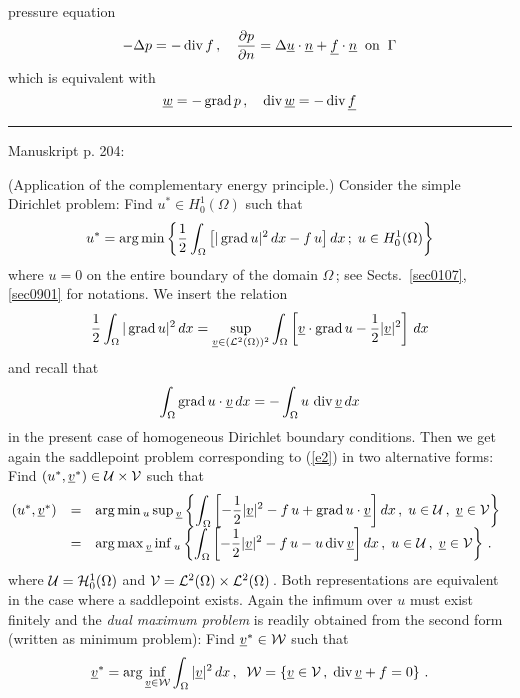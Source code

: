 \documentclass[12pt,a4paper,USenglish,twoside]{book}
\begin{document}
pressure equation 
\[
-\Delta p = - \mathop{\rm div}\nolimits f\,,\quad 
\frac{\partial p}{\partial n} = \Delta \underline{u} \cdot \underline{n} + \underline{f}\cdot \underline{n} \;\; \text{on} \;\; \Gamma
\]
which is equivalent with
\[
\underline{w} = -\mathop{\rm grad}\nolimits p \,,\quad \mathop{\rm div}\nolimits\underline{w} = - \mathop{\rm div}\nolimits \underline{f}
\]
\par\vspace{1ex}\hrule\vspace{1ex}
\newpage
Manuskript p. 204:
\begin{example}\label{b2} (Application of the complementary energy principle.)
Consider the simple {\sc Dirichlet} problem: Find $u^* \in H^1_0(\Omega)$ such that
%
\begin{equation}\label{e2}
u^* = \arg\min\left\{\frac12 \int_{\Omega}\big[|\mathop{\rm grad}\nolimits u|^2 \, dx - f\,u\big]\, dx\,;
\; u \in H^1_0(\Omega)\right\}
\end{equation}
%
where $u = 0$ on the entire boundary of the domain $\Omega$\,; see Sects.\ 
\ref{sec0107}, \ref{sec0901} for notations. We insert the relation
%
\[
\frac12\int_{\Omega}|\mathop{\rm grad}\nolimits u|^2\, dx = \sup_{\underline{v}\in ({\cal L}^2(\Omega))^2}
\int_{\Omega}\left[\underline{v} \cdot \mathop{\rm grad}\nolimits u - \frac12 |\underline{v}|^2\right]\, dx
\]
and recall that
%
\begin{equation}\label{e3}
\displaystyle \int_{\Omega}\mathop{\rm grad}\nolimits u \cdot \underline{v} \,dx  =  - \int_{\Omega}u \,\mathop{\rm div}\nolimits \underline{v}\, dx
\end{equation}
%
in the present case of homogeneous {\sc Dirichlet} boundary conditions. Then we get 
again the saddlepoint problem corresponding to (\ref{e2}) in two alternative forms: Find $(u^*,\underline{v}^*) \in {\cal U}\times {\cal V}$ such that
%
\begin{equation}\label{e4}
\ba{.}{lll}
(u^*,\v^*) &=& \dis \arg\min{}_u\sup{}_{\v}
\left\{\int_{\Omega}\left[-\frac12|\v|^2 - f\,u  + \grad u \cdot \v\right] dx\,,
\; u \in \U\,,\; \v \in \V \right\}\\
%
 &=& \dis \arg\max{}_{\v} \inf{}_u
\left\{\int_{\Omega}\left[-\frac12|\v|^2 - f\,u  - u \div \v\right] dx\,,
\; u \in \U\,,\; \v \in \V \right\}\,.
\ea{.}
\end{equation}
%
where ${\cal U} = {\cal H}^1_0(\Omega)$ and ${\cal V} = {\cal L}^2(\Omega) \times {\cal L}^2(\Omega)$\,.
\index{saddlepoint problem}
Both representations are equivalent in the case where a saddlepoint exists. Again  
the infimum over $u$ must exist finitely and the {\em dual maximum problem} is readily 
obtained from the second form (written as minimum problem): Find $\underline{v}^* \in {\cal W}$ such that
%
\begin{equation}\label{e5}
\v^* = \arg\inf_{\v \in \W} \int_{\Omega}|\v|^2\, dx\,, \;\; 
\W   = \left\{\v \in \V\,,\; \div \v + f = 0\right\}\,.

\end{equation}
\end{example}
\end{document}
